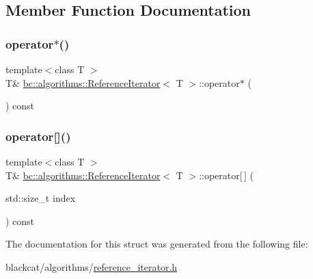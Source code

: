 \subsection{Member Function Documentation}
\mbox{\label{structbc_1_1algorithms_1_1ReferenceIterator_a900a5ec835d64f816baceec5ba070bf3}} 
\subsubsection{\texorpdfstring{operator$\ast$()}{operator*()}}
{\footnotesize\ttfamily template$<$class T $>$ \\
T\& \hyperlink{structbc_1_1algorithms_1_1ReferenceIterator}{bc\+::algorithms\+::\+Reference\+Iterator}$<$ T $>$\+::operator$\ast$ (\begin{DoxyParamCaption}{ }\end{DoxyParamCaption}) const\hspace{0.3cm}{\ttfamily [inline]}}

\mbox{\label{structbc_1_1algorithms_1_1ReferenceIterator_ad375c7d29fbe337db734fc953a185a4a}} 
\subsubsection{\texorpdfstring{operator[]()}{operator[]()}}
{\footnotesize\ttfamily template$<$class T $>$ \\
T\& \hyperlink{structbc_1_1algorithms_1_1ReferenceIterator}{bc\+::algorithms\+::\+Reference\+Iterator}$<$ T $>$\+::operator\mbox{[}$\,$\mbox{]} (\begin{DoxyParamCaption}\item[{std\+::size\+\_\+t}]{index }\end{DoxyParamCaption}) const\hspace{0.3cm}{\ttfamily [inline]}}



The documentation for this struct was generated from the following file\+:\begin{DoxyCompactItemize}
\item 
blackcat/algorithms/\hyperlink{reference__iterator_8h}{reference\+\_\+iterator.\+h}\end{DoxyCompactItemize}

